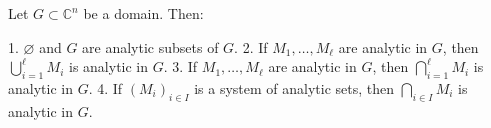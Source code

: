 Let $G \subset \mathbb{C}^n$ be a domain. Then:

1. $\varnothing$ and $G$ are analytic subsets of $G$.
2. If $M_1, \ldots, M_\ell$ are analytic in $G$, then $\bigcup_{i=1}^{\ell} M_i$ is analytic in $G$.
3. If $M_1, \ldots, M_\ell$ are analytic in $G$, then $\bigcap_{i=1}^{\ell} M_i$ is analytic in $G$.
4. If $(M_i)_{i \in I}$ is a system of analytic sets, then $\bigcap_{i \in I} M_i$ is analytic in $G$.
